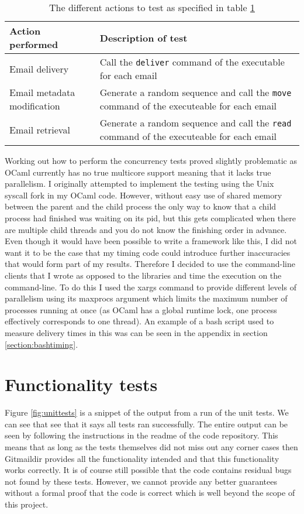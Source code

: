 \begin{table}[h]
\centering
\begin{tabular}{p{4cm} p{10.5cm}}
  \toprule
  Action performed & Description of test \\
  \midrule
  Email delivery & Call the \texttt{deliver} command of the executable for each email \\
  Email metadata modification & Generate a random sequence and call the \texttt{move} command of the executeable for each email \\
  Email retrieval & Generate a random sequence and call the \texttt{read} command of the executeable for each email \\
  \bottomrule
\end{tabular}
\caption{The different actions to test as specified in table \ref{table:actions}}
\label{table:actions}
\end{table}

Working out how to perform the concurrency tests proved slightly problematic as OCaml currently has no true multicore support meaning that it lacks true parallelism. I originally attempted to implement the testing using the Unix syscall fork in my OCaml code. However, without easy use of shared memory between the parent and the child process the only way to know that a child process had finished was waiting on its pid, but this gets complicated when there are multiple child threads and you do not know the finishing order in advance. Even though it would have been possible to write a framework like this, I did not want it to be the case that my timing code could introduce further inaccuracies that would form part of my results. Therefore I decided to use the command-line clients that I wrote as opposed to the libraries and time the execution on the command-line. To do this I used the xargs command to provide different levels of parallelism using its maxprocs argument which limits the maximum number of processes running at once (as OCaml has a global runtime lock, one process effectively corresponds to one thread). An example of a bash script used to measure delivery times in this was can be seen in the appendix in section \ref{section:bashtiming}.

\section{Functionality tests} \label{section:functionality_tests}

Figure \ref{fig:unittests} is a snippet of the output from a run of the unit tests. We can see that see that it says all tests ran successfully. The entire output can be seen by following the instructions in the readme of the code repository. This means that as long as the tests themselves did not miss out any corner cases then Gitmaildir provides all the functionality intended and that this functionality works correctly. It is of course still possible that the code contains residual bugs not found by these tests. However, we cannot provide any better guarantees without a formal proof that the code is correct which is well beyond the scope of this project.

